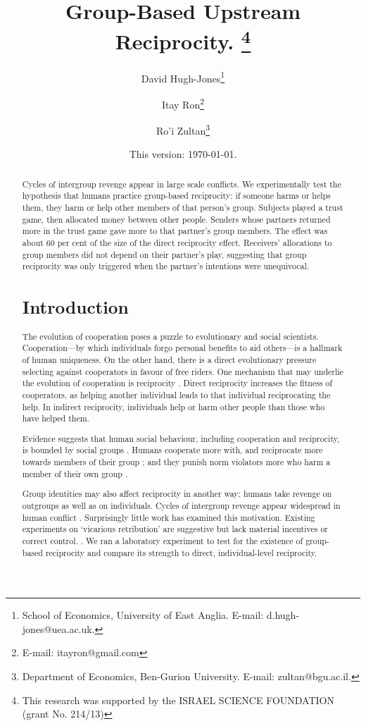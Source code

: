 \documentclass[12pt,a4paper]{article}
\title{
Group-Based Upstream Reciprocity.%
\thanks{
This research was supported by the ISRAEL SCIENCE FOUNDATION (grant No. 214/13)
}}
\author{David Hugh-Jones\thanks{School of Economics, University of East Anglia. E-mail: d.hugh-jones@uea.ac.uk.} \and Itay Ron\thanks{E-mail: itayron@gmail.com} \and Ro'i Zultan\thanks{Department of Economics, Ben-Gurion University. E-mail: zultan@bgu.ac.il.}}
\date{\sffamily \small This version: \today.} %
\begin{document}
\maketitle

\begin{abstract}
Cycles of intergroup revenge appear in large scale conflicts. We experimentally test the hypothesis that humans
practice group-based reciprocity: if someone harms or helps them,
they harm or help other members of that person's group. Subjects played a trust game, then allocated money between other people.
Senders whose partners returned more in the trust game gave more to that partner's group members. The effect was about 60 per cent
of the size of the direct reciprocity effect. Receivers' allocations to group members did not depend on their partner's play, suggesting
that group reciprocity was only triggered when the partner's intentions were unequivocal.

\section{Introduction}

The evolution of cooperation poses a puzzle to evolutionary and social scientists. Cooperation---by which individuals forgo personal benefits to aid others---is a hallmark of human uniqueness. On the other hand, there is a direct evolutionary pressure selecting against cooperators in favour of free riders. One mechanism that may underlie the evolution of cooperation is reciprocity \citet{nowak2006five,nowak2012evolving,}. Direct reciprocity increases the fitness of cooperators, as helping another individual leads to that individual reciprocating the help. In indirect reciprocity, individuals help or harm other people than those who have helped them.

Evidence suggests that human social behaviour, including cooperation and reciprocity, is bounded by social groups \citep*{tajfel1979integrative,balliet2014ingroup,DeDreu2014}. Humans cooperate more with, and reciprocate more towards members of their group \citep*{chen2009group,chen2011potential}; and they punish norm violators more who harm a member of their own group \citep*{bernhard2006group,bernhard2006parochial}.


Group identities may also affect reciprocity in another way: humans take revenge on outgroups as well as on individuals. Cycles of intergroup revenge appear widespread in human conflict \citep*{}. Surprisingly little work has examined this motivation. Existing experiments on `vicarious retribution' are suggestive but lack material incentives or correct control. \citep*{XXX}. We ran a laboratory experiment to test for the existence of group-based reciprocity and compare its strength to direct, individual-level reciprocity.


\end{abstract}
\end{document}
